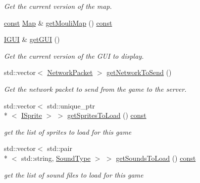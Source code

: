 \begin{DoxyCompactItemize}
\begin{DoxyCompactList}\small\item\em Get the current version of the map. \end{DoxyCompactList}\item 
\hyperlink{term__entry_8h_a57bd63ce7f9a353488880e3de6692d5a}{const} \hyperlink{classarcade_1_1_map}{Map} \& \hyperlink{classarcade_1_1_centipede_game_a13c9afca767a3660ddc6f9f887541eb6}{get\-Mouli\-Map} () \hyperlink{term__entry_8h_a57bd63ce7f9a353488880e3de6692d5a}{const} 
\item 
\hyperlink{classarcade_1_1_i_g_u_i}{I\-G\-U\-I} \& \hyperlink{classarcade_1_1_centipede_game_af13a64c23ce392cb49da2df7ac520581}{get\-G\-U\-I} ()
\begin{DoxyCompactList}\small\item\em Get the current version of the G\-U\-I to display. \end{DoxyCompactList}\item 
std\-::vector$<$ \hyperlink{structarcade_1_1_network_packet}{Network\-Packet} $>$ \hyperlink{classarcade_1_1_centipede_game_ac15ad3e47e29f57c3adc4a2fcc71821f}{get\-Network\-To\-Send} ()
\begin{DoxyCompactList}\small\item\em Get the network packet to send from the game to the server. \end{DoxyCompactList}\item 
std\-::vector$<$ std\-::unique\-\_\-ptr\\*
$<$ \hyperlink{classarcade_1_1_i_sprite}{I\-Sprite} $>$ $>$ \hyperlink{classarcade_1_1_centipede_game_a9f7172352ba26e86c0605b40a4ed1231}{get\-Sprites\-To\-Load} () \hyperlink{term__entry_8h_a57bd63ce7f9a353488880e3de6692d5a}{const} 
\begin{DoxyCompactList}\small\item\em get the list of sprites to load for this game \end{DoxyCompactList}\item 
std\-::vector$<$ std\-::pair\\*
$<$ std\-::string, \hyperlink{namespacearcade_a3bb4743a2eea59f3927e404e6549cae5}{Sound\-Type} $>$ $>$ \hyperlink{classarcade_1_1_centipede_game_a6b8ba2608713f0ff32a2624e346f6206}{get\-Sounds\-To\-Load} () \hyperlink{term__entry_8h_a57bd63ce7f9a353488880e3de6692d5a}{const} 
\begin{DoxyCompactList}\small\item\em get the list of sound files to load for this game \end{DoxyCompactList}\item 

\end{DoxyCompactItemize}
